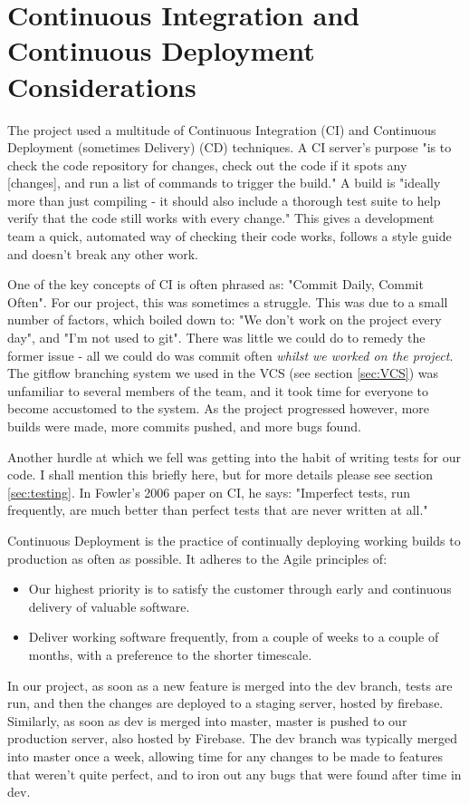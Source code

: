 \documentclass{l3proj}
\begin{document}
\section{Continuous Integration and Continuous Deployment Considerations}
\label{sec:cicd}

The project used a multitude of Continuous Integration (CI) and Continuous
 Deployment (sometimes Delivery) (CD) techniques. A CI server's purpose "is to check the code
 repository for changes, check out the code if it spots any [changes], and run a
 list of commands to trigger the build."\cite{meyer2014continuous} A build is "ideally more than just
 compiling - it should also include a thorough test suite to help verify that the code
 still works with every change."\cite{meyer2014continuous} This gives a development
 team a quick, automated way of checking their code works, follows a style guide and
 doesn't break any other work.

One of the key concepts of CI is often phrased as: "Commit Daily,
 Commit Often"\cite{meyer2014continuous}. For our project, this was sometimes a struggle.
 This was due to a small number of factors, which boiled down to: "We don't work on the project
 every day", and "I'm not used to git". There was little we could do to remedy the former issue -
 all we could do was commit often \textit{whilst we worked on the project}. The gitflow
 branching system we used in the VCS (see section \ref{sec:VCS}) was unfamiliar to several
 members of the team, and it took time for everyone to become accustomed to the system. As the
 project progressed however, more builds were made, more commits pushed, and more bugs found.

Another hurdle at which we fell was getting into the habit of writing tests for our code. I shall
 mention this briefly here, but for more details please see section \ref{sec:testing}. In Fowler's
 2006 paper on CI, he says: "Imperfect tests, run frequently, are much better than perfect tests
 that are never written at all."\cite{fowler2006continuous}

Continuous Deployment is the practice of continually deploying working builds to production
 as often as possible. It adheres to the Agile principles of:
 \begin{itemize}
 \item
 Our highest priority is to satisfy the customer
 through early and continuous delivery
 of valuable software. \cite{agileprinciples}
 \item
 Deliver working software frequently, from a
 couple of weeks to a couple of months, with a
 preference to the shorter timescale. \cite{agileprinciples}
 \end{itemize}
 In our project, as soon as a new feature is merged into the dev branch,
 tests are run, and then the changes are deployed to a staging server, hosted by firebase. Similarly,
 as soon as dev is merged into master, master is pushed to our production server, also hosted by Firebase.
 The dev branch was typically merged into master once a week, allowing time for any changes to be made
 to features that weren't quite perfect, and to iron out any bugs that were found after time in dev.
\end{document}
